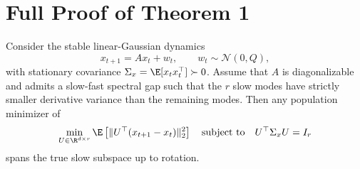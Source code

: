
\section{Full Proof of Theorem 1}
\label{app:theorem1_full_proof}

\begin{theorem}
Consider the stable linear-Gaussian dynamics
\begin{equation}
    x_{t+1}=Ax_t+w_t,
    \qquad
    w_t \sim \mathcal{N}(0,Q),
\end{equation}
with stationary covariance $\Sigma_x=\E[x_t x_t^\top]\succ 0$. Assume that
$A$ is diagonalizable and admits a slow-fast spectral gap such that the $r$
slow modes have strictly smaller derivative variance than the remaining modes.
Then any population minimizer of
\begin{equation}
    \min_{U \in \R^{d \times r}}
    \E\left[\|U^\top(x_{t+1}-x_t)\|_2^2\right]
    \quad
    \text{subject to}
    \quad
    U^\top \Sigma_x U = I_r
\end{equation}
spans the true slow subspace up to rotation.
\end{theorem}

